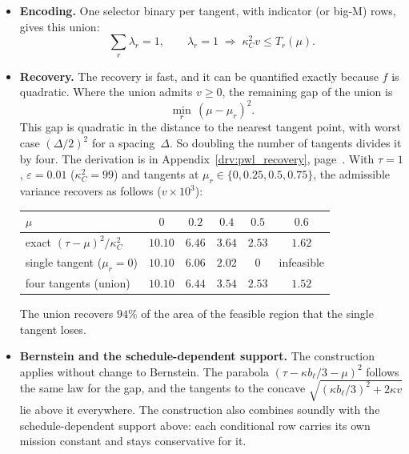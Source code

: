 \documentclass[11pt,a4paper]{article}
\theoremstyle{plain}
\theoremstyle{definition}
\theoremstyle{remark}
\begin{document}
\begin{itemize}
\begin{equation}
      \kappa_C^2 v \;\le\; \max_r T_r(\mu).
    \end{equation}
  \item \textbf{Encoding.} One selector binary per tangent, with indicator (or big-M) rows, gives this union:
    \begin{equation}
      \sum_r \lambda_r = 1,
      \qquad
      \lambda_r = 1 \;\Rightarrow\; \kappa_C^2 v \le T_r(\mu).
    \end{equation}
  \item \textbf{Recovery.} The recovery is fast, and it can be quantified exactly because $f$ is quadratic.
    Where the union admits $v \ge 0$, the remaining gap of the union is
    \begin{equation}\label{eq:pwl_union_gap}
      \min_r\, (\mu - \mu_r)^2.
    \end{equation}
    This gap is quadratic in the distance to the nearest tangent point, with worst case $(\Delta/2)^2$ for a spacing~$\Delta$.
    So doubling the number of tangents divides it by four.
    The derivation is in Appendix~\ref{drv:pwl_recovery}, page~\pageref{drv:pwl_recovery}.
    With $\tau = 1$, $\varepsilon = 0.01$ ($\kappa_C^2 = 99$) and tangents at $\mu_r \in \{0, 0.25, 0.5, 0.75\}$, the admissible variance recovers as follows ($v \times 10^{3}$):
\begin{center}
\footnotesize
\begin{tabular}{@{}lccccc@{}}
\toprule
\rowcolor{headgrey}
$\mu$ & $0$ & $0.2$ & $0.4$ & $0.5$ & $0.6$ \\
\midrule
exact $(\tau-\mu)^2/\kappa_C^2$ & $10.10$ & $6.46$ & $3.64$ & $2.53$ & $1.62$ \\
single tangent ($\mu_r = 0$)    & $10.10$ & $6.06$ & $2.02$ & $0$    & infeasible \\
four tangents (union)           & $10.10$ & $6.44$ & $3.54$ & $2.53$ & $1.52$ \\
\bottomrule
\end{tabular}
\end{center}
    The union recovers $94\%$ of the area of the feasible region that the single tangent loses.
  \item \textbf{Bernstein and the schedule-dependent support.} The construction applies without change to Bernstein.
    The parabola $(\tau - \kappa b_\ell/3 - \mu)^2$ follows the same law for the gap, and the tangents to the concave $\sqrt{(\kappa b_\ell/3)^2 + 2\kappa v}$ lie above it everywhere.
    The construction also combines soundly with the schedule-dependent support above: each conditional row carries its own mission constant and stays conservative for it.
\end{itemize}
\end{document}
